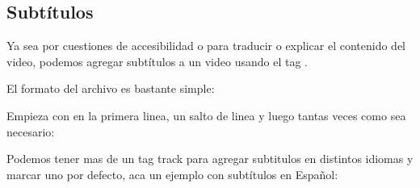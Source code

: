 \documentclass[letterpaper,10pt,spanish]{sphinxmanual}
\begin{document}
\subsection{Subtítulos}
\label{\detokenize{audio-y-video:subtitulos}}
Ya sea por cuestiones de accesibilidad o para traducir o explicar el contenido
del video, podemos agregar subtítulos a un video usando el tag .

El formato del archivo es bastante simple:

%
\begin{sphinxVerbatim}[commandchars=\\\{\}]

  
      

  
      

\end{sphinxVerbatim}

Empieza con  en la primera linea, un salto de linea y luego
tantas veces como sea necesario:

%
\begin{sphinxVerbatim}[commandchars=\\\{\}]
\PYG{p}{[} \PYG{p}{]}  \PYG{p}{[} \PYG{p}{]}
  
\end{sphinxVerbatim}

Podemos tener mas de un tag track para agregar subtitulos en distintos idiomas
y marcar uno por defecto, aca un ejemplo con subtítulos en Español:
\end{document}
